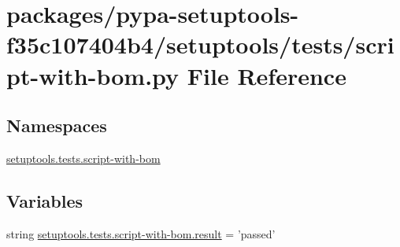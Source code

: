 \hypertarget{script-with-bom_8py}{}\section{packages/pypa-\/setuptools-\/f35c107404b4/setuptools/tests/script-\/with-\/bom.py File Reference}
\label{script-with-bom_8py}
\subsection*{Namespaces}
\begin{DoxyCompactItemize}
\item 
 \hyperlink{namespacesetuptools_1_1tests_1_1script-with-bom}{setuptools.\+tests.\+script-\/with-\/bom}
\end{DoxyCompactItemize}
\subsection*{Variables}
\begin{DoxyCompactItemize}
\item 
string \hyperlink{namespacesetuptools_1_1tests_1_1script-with-bom_aedbbee7b08f71658715a57fda5833f10}{setuptools.\+tests.\+script-\/with-\/bom.\+result} = 'passed'
\end{DoxyCompactItemize}
